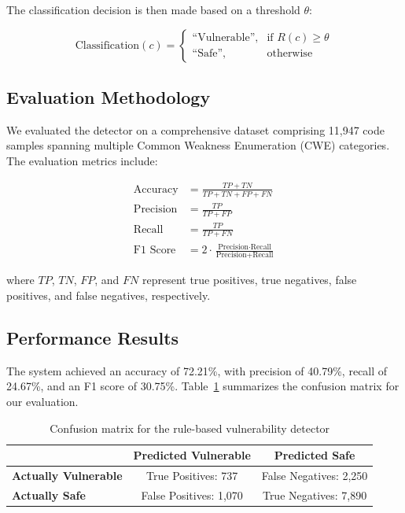 \documentclass{article}
\begin{document}
The classification decision is then made based on a threshold $\theta$:

\begin{equation}
    \text{Classification}(c) = 
    \begin{cases}
        \text{``Vulnerable''}, & \text{if } R(c) \geq \theta \\
        \text{``Safe''}, & \text{otherwise}
    \end{cases}
\end{equation}

\subsection{Evaluation Methodology}

We evaluated the detector on a comprehensive dataset comprising 11,947 code samples spanning multiple Common Weakness Enumeration (CWE) categories. The evaluation metrics include:

\begin{align}
    \text{Accuracy} &= \frac{TP + TN}{TP + TN + FP + FN} \\
    \text{Precision} &= \frac{TP}{TP + FP} \\
    \text{Recall} &= \frac{TP}{TP + FN} \\
    \text{F1 Score} &= 2 \cdot \frac{\text{Precision} \cdot \text{Recall}}{\text{Precision} + \text{Recall}}
\end{align}

where $TP$, $TN$, $FP$, and $FN$ represent true positives, true negatives, false positives, and false negatives, respectively.

\subsection{Performance Results}

The system achieved an accuracy of 72.21\%, with precision of 40.79\%, recall of 24.67\%, and an F1 score of 30.75\%. Table~\ref{tab:rule_based_results} summarizes the confusion matrix for our evaluation.

\begin{table}[ht]
\centering
\begin{tabular}{lcc}
\hline
& \textbf{Predicted Vulnerable} & \textbf{Predicted Safe} \\
\hline
\textbf{Actually Vulnerable} & True Positives: 737 & False Negatives: 2,250 \\
\textbf{Actually Safe} & False Positives: 1,070 & True Negatives: 7,890 \\
\hline
\end{tabular}
\caption{Confusion matrix for the rule-based vulnerability detector}
\label{tab:rule_based_results}
\end{table}
\end{document}
